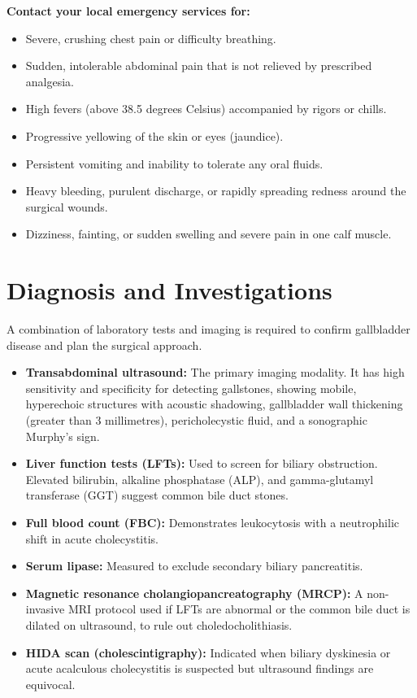\textbf{Contact your local emergency services for:}
\begin{itemize}
    \item Severe, crushing chest pain or difficulty breathing.
    \item Sudden, intolerable abdominal pain that is not relieved by prescribed analgesia.
    \item High fevers (above 38.5 degrees Celsius) accompanied by rigors or chills.
    \item Progressive yellowing of the skin or eyes (jaundice).
    \item Persistent vomiting and inability to tolerate any oral fluids.
    \item Heavy bleeding, purulent discharge, or rapidly spreading redness around the surgical wounds.
    \item Dizziness, fainting, or sudden swelling and severe pain in one calf muscle.
\end{itemize}

\section*{Diagnosis and Investigations}
A combination of laboratory tests and imaging is required to confirm gallbladder disease and plan the surgical approach.
\begin{itemize}
    \item \textbf{Transabdominal ultrasound:} The primary imaging modality. It has high sensitivity and specificity for detecting gallstones, showing mobile, hyperechoic structures with acoustic shadowing, gallbladder wall thickening (greater than 3 millimetres), pericholecystic fluid, and a sonographic Murphy's sign.
    \item \textbf{Liver function tests (LFTs):} Used to screen for biliary obstruction. Elevated bilirubin, alkaline phosphatase (ALP), and gamma-glutamyl transferase (GGT) suggest common bile duct stones.
    \item \textbf{Full blood count (FBC):} Demonstrates leukocytosis with a neutrophilic shift in acute cholecystitis.
    \item \textbf{Serum lipase:} Measured to exclude secondary biliary pancreatitis.
    \item \textbf{Magnetic resonance cholangiopancreatography (MRCP):} A non-invasive MRI protocol used if LFTs are abnormal or the common bile duct is dilated on ultrasound, to rule out choledocholithiasis.
    \item \textbf{HIDA scan (cholescintigraphy):} Indicated when biliary dyskinesia or acute acalculous cholecystitis is suspected but ultrasound findings are equivocal.
\end{itemize}


